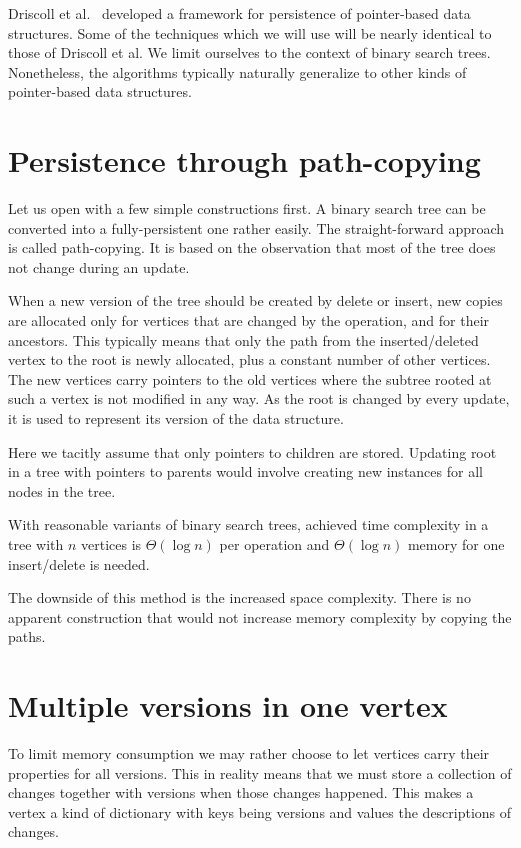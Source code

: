Driscoll et al.~\cite{persistence-DSST} developed a framework for persistence of pointer-based data structures. 
Some of the techniques which we will use will be nearly identical to those of Driscoll et al.
We limit ourselves to the context of binary search trees. 
Nonetheless, the algorithms typically naturally generalize to other kinds of pointer-based data structures.


\section{Persistence through path-copying}

Let us open with a few simple constructions first. A binary search tree can be converted into a fully-persistent one rather easily.
The straight-forward approach is called path-copying. It is based on the observation that most of the tree does not change during an update.

When a new version of the tree should be created by delete or insert, new copies are allocated only for vertices that are changed by the operation, and for their ancestors. 
This typically means that only the path from the inserted/deleted vertex to the root is newly allocated, plus a constant number of other vertices. 
The new vertices carry pointers to the old vertices where the subtree rooted at such a vertex is not modified in any way.
As the root is changed by every update, it is used to represent its version of the data structure.

Here we tacitly assume that only pointers to children are stored. 
Updating root in a tree with pointers to parents would involve creating new instances for all nodes in the tree.

With reasonable variants of binary search trees, achieved time complexity in a tree with $n$ vertices is $\Theta(\log n)$ per operation and $\Theta(\log n)$ memory for one insert/delete is needed.

The downside of this method is the increased space complexity. 
There is no apparent construction that would not increase memory complexity by copying the paths.

\section{Multiple versions in one vertex}

To limit memory consumption we may rather choose to let vertices carry their properties for all versions. This in reality means that we must store a collection of changes together with versions when those changes happened. This makes a vertex a kind of dictionary with keys being versions and values the descriptions of changes.

